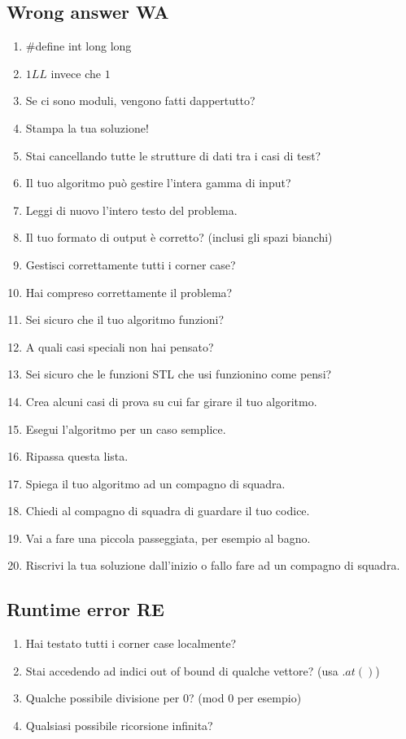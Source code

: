 \documentclass{article}
\begin{document}
\subsection{Wrong answer WA}
\begin{enumerate}
    \item $\#$define int long long
    \item $1LL$ invece che $1$
    \item Se ci sono moduli, vengono fatti dappertutto?
    \item Stampa la tua soluzione!
    \item Stai cancellando tutte le strutture di dati tra i casi di test?
    \item Il tuo algoritmo può gestire l'intera gamma di input?
    \item Leggi di nuovo l'intero testo del problema.
    \item Il tuo formato di output è corretto? (inclusi gli spazi bianchi)
    \item Gestisci correttamente tutti i corner case?
    \item Hai compreso correttamente il problema?
    \item Sei sicuro che il tuo algoritmo funzioni?
    \item A quali casi speciali non hai pensato?
    \item Sei sicuro che le funzioni STL che usi funzionino come pensi?
    \item Crea alcuni casi di prova su cui far girare il tuo algoritmo.
    \item Esegui l'algoritmo per un caso semplice.
    \item Ripassa questa lista.
    \item Spiega il tuo algoritmo ad un compagno di squadra.
    \item Chiedi al compagno di squadra di guardare il tuo codice.
    \item Vai a fare una piccola passeggiata, per esempio al bagno.
    \item Riscrivi la tua soluzione dall'inizio o fallo fare ad un compagno di squadra.
\end{enumerate}

\subsection{Runtime error RE}
\begin{enumerate}
    \item Hai testato tutti i corner case localmente?
    \item Stai accedendo ad indici out of bound di qualche vettore? (usa $.at()$)
    \item Qualche possibile divisione per 0? (mod 0 per esempio)
    \item Qualsiasi possibile ricorsione infinita?
\end{enumerate}
\end{document}
